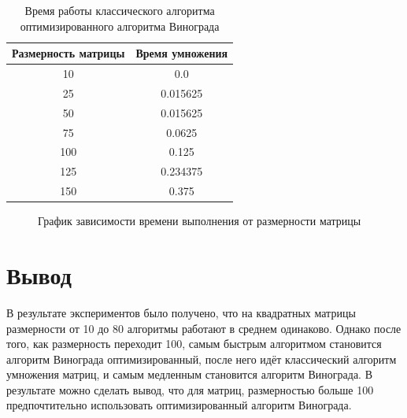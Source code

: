 \begin{table}[h!]
  \begin{center}
    \captionsetup{justification=raggedright}
    \caption{Время работы классического алгоритма оптимизированного алгоритма Винограда}
    \label{tab:workcost_classic}
    \begin{tabular}{c|c}
      \textbf{Размерность матрицы} & \textbf{Время умножения}\\
      \hline
	10 & 0.0\\
	25 & 0.015625\\
	50 & 0.015625\\
	75 & 0.0625\\
	100 & 0.125\\
	125 & 0.234375\\
	150 & 0.375\\
    \end{tabular}
  \end{center}
\end{table}

\newpage

\begin{figure}[ph!]
	\caption{График зависимости времени выполнения от размерности матрицы}
\end{figure}

\section{Вывод}
В результате экспериментов было получено, что на квадратных матрицы размерности от 10 до 80 алгоритмы работают в среднем одинаково. Однако после того, как размерность переходит 100, самым быстрым алгоритмом становится алгоритм Винограда оптимизированный, после него идёт классический алгоритм умножения матриц, и самым медленным становится алгоритм Винограда. В результате можно сделать вывод, что для матриц, размерностью больше 100 предпочтительно использовать оптимизированный алгоритм Винограда.